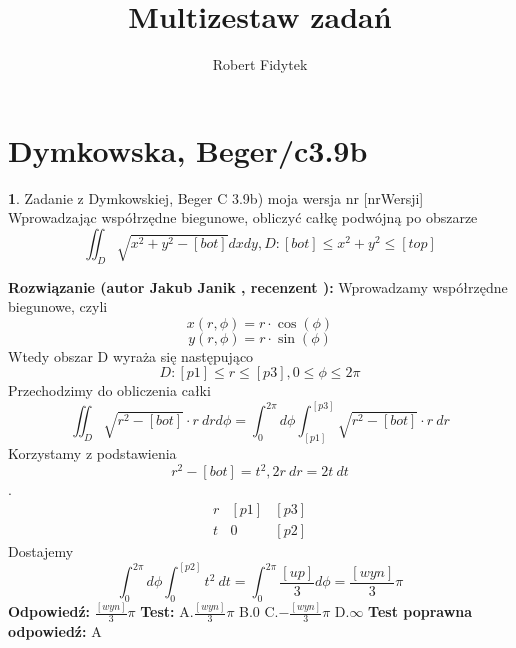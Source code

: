\documentclass[12pt, a4paper]{article}
\title{Multizestaw zadań}
\author{Robert Fidytek}
\date{}
\theoremstyle{definition} %
\newtheorem{zad}{}
\newcommand{\kategoria}[1]{\section{#1}} %
\newcommand{\zadStart}[1]{\begin{zad}#1\newline} %
\newcommand{\zadStop}{\end{zad}}   %
\newcommand{\rozwStart}[2]{\noindent \textbf{Rozwiązanie (autor #1 , recenzent #2): }\newline} %
\newcommand{\rozwStop}{\newline}                                            %
\newcommand{\odpStart}{\noindent \textbf{Odpowiedź:}\newline}    %
\newcommand{\odpStop}{\newline}                                             %
\newcommand{\testStart}{\noindent \textbf{Test:}\newline} %
\newcommand{\testStop}{\newline} %
\newcommand{\kluczStart}{\noindent \textbf{Test poprawna odpowiedź:}\newline} %
\newcommand{\kluczStop}{\newline} %
\begin{document}
\maketitle


\kategoria{Dymkowska, Beger/c3.9b}
\zadStart{Zadanie z Dymkowskiej, Beger C 3.9b) moja wersja nr [nrWersji]}
Wprowadzając współrzędne biegunowe, obliczyć całkę podwójną po obszarze $$\iint_D \sqrt{x^2+y^2-[bot]} dxdy, D: [bot] \leq x^2+y^2 \leq [top]$$
\zadStop
\rozwStart{Jakub Janik}{}
Wprowadzamy współrzędne biegunowe, czyli $$x(r,\phi)=r\cdot\cos{(\phi)}$$
$$y(r,\phi)=r\cdot\sin{(\phi)}$$
Wtedy obszar D wyraża się następująco $$D: [p1] \leq r \leq [p3], 0 \leq \phi \leq 2\pi$$
Przechodzimy do obliczenia całki
$$\iint_D \sqrt{r^2-[bot]}\cdot r\ drd\phi=\int_0^{2\pi}d\phi\int_{[p1]}^{[p3]}\sqrt{r^2-[bot]}\cdot r\ dr$$
Korzystamy z podstawienia $$r^2-[bot]=t^2, 2r\ dr=2t\ dt$$.
\begin{displaymath}
\left.\begin{array}{c|c|c}
r & [p1] & [p3] \\ \hline
t & 0 & [p2]
\end{array}\right.
\end{displaymath}
Dostajemy
$$\int_0^{2\pi}d\phi\int_0^{[p2]}t^2\ dt=\int_0^{2\pi}\frac{[up]}{3}d\phi=\frac{[wyn]}{3}\pi$$
\rozwStop
\odpStart
$\frac{[wyn]}{3}\pi$
\odpStop
\testStart
A.$\frac{[wyn]}{3}\pi$
B.$0$
C.$-\frac{[wyn]}{3}\pi$
D.$\infty$
\testStop
\kluczStart
A
\kluczStop
\end{document}

